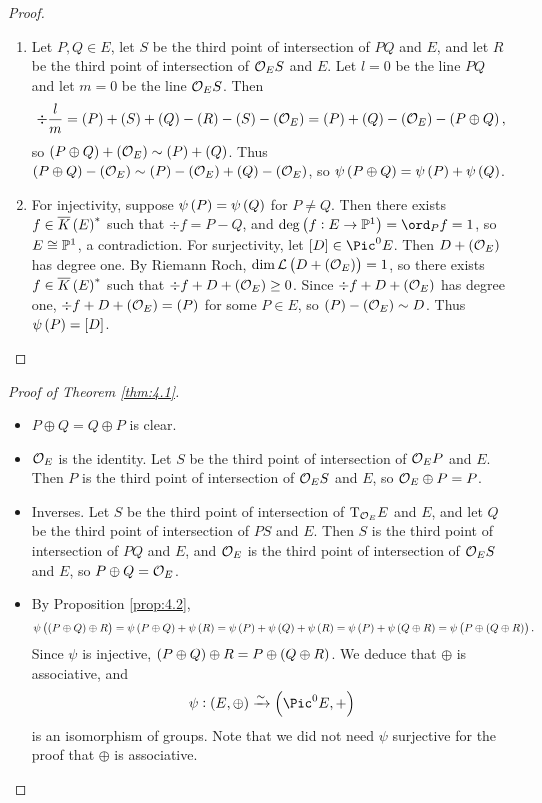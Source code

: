 \begin{proof}
\hfill
\begin{enumerate}
\item Let $ P, Q \in E $, let $ S $ be the third point of intersection of $ PQ $ and $ E $, and let $ R $ be the third point of intersection of $ \mathcal{O}_ES $ and $ E $. Let $ l = 0 $ be the line $ PQ $ and let $ m = 0 $ be the line $ \mathcal{O}_ES $. Then
$$ \div \dfrac{l}{m} = \br{P} + \br{S} + \br{Q} - \br{R} - \br{S} - \br{\OOO_E} = \br{P} + \br{Q} - \br{\OOO_E} - \br{P \oplus Q}, $$
so $ \br{P \oplus Q} + \br{\OOO_E} \sim \br{P} + \br{Q} $. Thus $ \br{P \oplus Q} - \br{\OOO_E} \sim \br{P} - \br{\OOO_E} + \br{Q} - \br{\OOO_E} $, so $ \psi\br{P \oplus Q} = \psi\br{P} + \psi\br{Q} $.
\item For injectivity, suppose $ \psi\br{P} = \psi\br{Q} $ for $ P \ne Q $. Then there exists $ f \in \overline{K}\br{E}^* $ such that $ \div f = P - Q $, and $ \deg \br{f : E \to \PP^1} = \ord_P f = 1 $, so $ E \cong \mathbb{P}^1 $, a contradiction. For surjectivity, let $ \sbr{D} \in \Pic^0 E $. Then $ D + \br{\OOO_E} $ has degree one. By Riemann Roch, $ \dim \LLL\br{D + \br{\OOO_E}} = 1 $, so there exists $ f \in \overline{K}\br{E}^* $ such that $ \div f + D + \br{\OOO_E} \ge 0 $. Since $ \div f + D + \br{\OOO_E} $ has degree one, $ \div f + D + \br{\OOO_E} = \br{P} $ for some $ P \in E $, so $ \br{P} - \br{\OOO_E} \sim D $. Thus $ \psi\br{P} = \sbr{D} $.
\end{enumerate}
\end{proof}

\pagebreak

\begin{proof}[Proof of Theorem \ref{thm:4.1}]
\hfill
\begin{itemize}
\item $ P \oplus Q = Q \oplus P $ is clear.
\item $ \mathcal{O}_E $ is the identity. Let $ S $ be the third point of intersection of $ \mathcal{O}_EP $ and $ E $. Then $ P $ is the third point of intersection of $ \mathcal{O}_ES $ and $ E $, so $ \mathcal{O}_E \oplus P = P $.
\item Inverses. Let $ S $ be the third point of intersection of $ \mathrm{T}_{\mathcal{O}_E}E $ and $ E $, and let $ Q $ be the third point of intersection of $ PS $ and $ E $. Then $ S $ is the third point of intersection of $ PQ $ and $ E $, and $ \mathcal{O}_E $ is the third point of intersection of $ \mathcal{O}_ES $ and $ E $, so $ P \oplus Q = \mathcal{O}_E $.
\item By Proposition \ref{prop:4.2},
$$ \psi\br{\br{P \oplus Q} \oplus R} = \psi\br{P \oplus Q} + \psi\br{R} = \psi\br{P} + \psi\br{Q} + \psi\br{R} = \psi\br{P} + \psi\br{Q \oplus R} = \psi\br{P \oplus \br{Q \oplus R}}. $$
Since $ \psi $ is injective, $ \br{P \oplus Q} \oplus R = P \oplus \br{Q \oplus R} $. We deduce that $ \oplus $ is associative, and
$$ \psi : \br{E, \oplus} \xrightarrow{\sim} \br{\Pic^0 E, +} $$
is an isomorphism of groups. Note that we did not need $ \psi $ surjective for the proof that $ \oplus $ is associative.
\end{itemize}
\end{proof}

